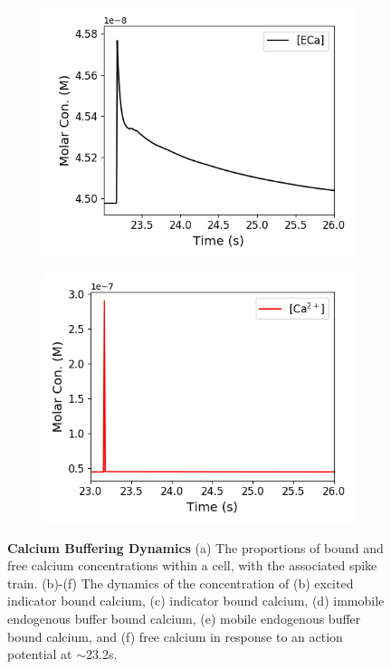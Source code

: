 \begin{figure}[p]
\begin{subfigure}{0.5\textwidth}
    \includegraphics[width=\textwidth]{figures/calcium_chapter/concentration_dynamics_18_zoomed_ECa.png}
    \caption{}
  \end{subfigure}
  \begin{subfigure}{0.5\textwidth}
    \includegraphics[width=\textwidth]{figures/calcium_chapter/concentration_dynamics_18_zoomed_Ca.png}
    \caption{}
  \end{subfigure}
  \caption{\textbf{Calcium Buffering Dynamics } (a) The proportions of bound and free calcium concentrations within a cell, with the associated spike train. (b)-(f) The dynamics of the concentration of (b) excited indicator bound calcium, (c) indicator bound calcium, (d) immobile endogenous buffer bound calcium, (e) mobile endogenous buffer bound calcium, and (f) free calcium in response to an action potential at $\sim$23.2s.}
  \label{fig:concentrations}
\end{figure}

